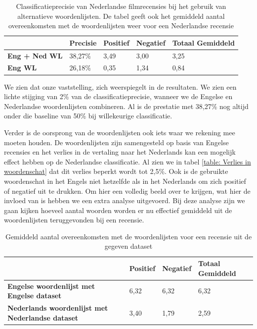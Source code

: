 \begin{table}[h]
\centering
\begin{tabular}{l|l|l|l|l|}
\cline{2-5}
                                         & {\bf Precisie} & {\bf Positief} & {\bf Negatief} & {\bf Totaal Gemiddeld} \\ \hline
\multicolumn{1}{|l|}{{\bf Eng + Ned WL}} & 38,27\%        & 3,49           & 3,00           & 3,25            \\ \hline
\multicolumn{1}{|l|}{{\bf Eng WL}}       & 26,18\%        & 0,35           & 1,34           & 0,84            \\ \hline
\end{tabular}
\caption{Classificatieprecisie van Nederlandse filmrecensies bij het gebruik van alternatieve woordenlijsten. De tabel geeft ook het gemiddeld aantal overeenkomsten met de woordenlijsten weer voor een Nederlandse recensie }
\label{altwoordenlijsten}
\end{table}

We zien dat onze vaststelling, zich weerspiegelt in de resultaten. We zien een lichte stijging van 2\% van de classificatieprecisie, wanneer we de Engelse en Nederlandse woordenlijsten combineren. Al is de prestatie met 38,27\% nog altijd onder die baseline van 50\% bij willekeurige classificatie.

Verder is de oorsprong van de woordenlijsten ook iets waar we rekening mee moeten houden. De woordenlijsten zijn samengesteld op basis van Engelse recensies en het verlies in de vertaling naar het Nederlands kan een mogelijk effect hebben op de Nederlandse classificatie. Al zien we in tabel \ref{table: Verlies in woordenschat} dat dit verlies beperkt wordt tot 2,5\%. Ook is de gebruikte woordenschat in het Engels niet hetzelfde als in het Nederlands om zich positief of negatief uit te drukken. Om hier een volledig beeld over te krijgen, wat hier de invloed van is hebben we een extra analyse uitgevoerd. Bij deze analyse zijn we gaan kijken hoeveel aantal woorden worden er nu effectief gemiddeld uit de woordenlijsten teruggevonden bij een recensie.\\

\begin{table}[h]
\centering
\begin{tabular}{l|l|l|l|}
\cline{2-4}
                                                 & {\bf Positief} & {\bf Negatief} & {\bf Totaal Gemiddeld} \\ \hline
\multicolumn{1}{|l|}{{\bf Engelse woordenlijst met Engelse dataset}} & 6,32           & 6,32           & 6,32            \\ \hline
\multicolumn{1}{|l|}{{\bf Nederlands woordenlijst met Nederlandse dataset}}           & 3,40           & 1,79           & 2,59            \\ \hline
\end{tabular}
\caption{Gemiddeld aantal overeenkomsten met de woordenlijsten voor een recensie uit de gegeven dataset}
\end{table}

